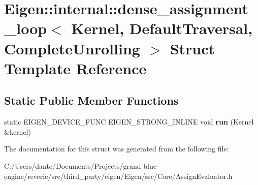 \hypertarget{struct_eigen_1_1internal_1_1dense__assignment__loop_3_01_kernel_00_01_default_traversal_00_01_complete_unrolling_01_4}{}\section{Eigen\+::internal\+::dense\+\_\+assignment\+\_\+loop$<$ Kernel, Default\+Traversal, Complete\+Unrolling $>$ Struct Template Reference}
\label{struct_eigen_1_1internal_1_1dense__assignment__loop_3_01_kernel_00_01_default_traversal_00_01_complete_unrolling_01_4}
\subsection*{Static Public Member Functions}
\begin{DoxyCompactItemize}
\item 
\mbox{\label{struct_eigen_1_1internal_1_1dense__assignment__loop_3_01_kernel_00_01_default_traversal_00_01_complete_unrolling_01_4_ae2963af4736cb63500650702da959d3f}} 
static E\+I\+G\+E\+N\+\_\+\+D\+E\+V\+I\+C\+E\+\_\+\+F\+U\+NC E\+I\+G\+E\+N\+\_\+\+S\+T\+R\+O\+N\+G\+\_\+\+I\+N\+L\+I\+NE void {\bfseries run} (Kernel \&kernel)
\end{DoxyCompactItemize}


The documentation for this struct was generated from the following file\+:\begin{DoxyCompactItemize}
\item 
C\+:/\+Users/dante/\+Documents/\+Projects/grand-\/blue-\/engine/reverie/src/third\+\_\+party/eigen/\+Eigen/src/\+Core/Assign\+Evaluator.\+h\end{DoxyCompactItemize}
